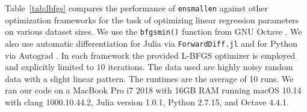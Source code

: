 \documentclass[twoside,11pt]{article}
\begin{document}



Table~\ref{tab:lbfgs} compares the performance
of {\tt ensmallen} against other optimization frameworks
for the task of optimizing linear regression parameters on various dataset sizes.
We use the {\tt bfgsmin()} function from GNU Octave \citep{octave}.
We also use automatic differentiation for Julia via {\tt ForwardDiff.jl} \citep{RevelsLubinPapamarkou2016}
and for Python via Autograd \citep{maclaurin2015autograd}.
In each framework the provided L-BFGS optimizer is employed
and explicitly limited to $10$ iterations.
The data used are highly noisy random data with a slight linear pattern.
The runtimes are the average of 10 runs.
We ran our code on a MacBook Pro i7 2018 with 16GB RAM running macOS 10.14
with clang 1000.10.44.2, Julia version 1.0.1, Python 2.7.15, and Octave 4.4.1.



\end{document}

